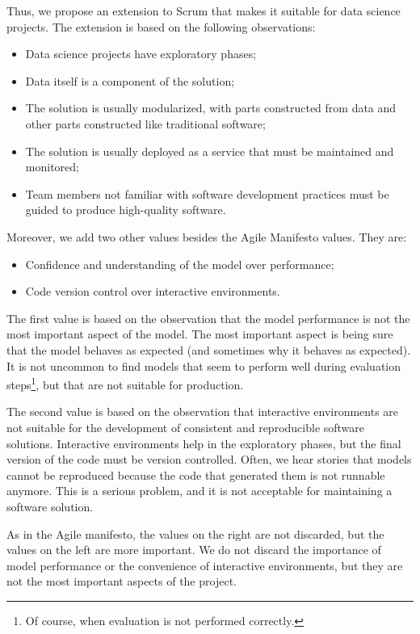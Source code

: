 Thus, we propose an extension to Scrum that makes it suitable for data science projects.
The extension is based on the following observations:
\begin{itemize}
  \itemsep0em
  \item Data science projects have exploratory phases;
  \item Data itself is a component of the solution;
  \item The solution is usually modularized, with parts constructed from data and other parts
    constructed like traditional software;
  \item The solution is usually deployed as a service that must be maintained and
    monitored;
  \item Team members not familiar with software development practices must be guided to
    produce high-quality software.
\end{itemize}

Moreover, we add two other values besides the Agile Manifesto values.  They are:
\begin{itemize}
  \itemsep0em
  \item Confidence and understanding of the model over performance;
  \item Code version control over interactive environments.
\end{itemize}

The first value is based on the observation that the model performance is not the most
important aspect of the model.  The most important aspect is being sure that the model
behaves as expected (and sometimes why it behaves as expected).  It is not uncommon to find
models that seem to perform well during evaluation steps\footnote{Of course, when
evaluation is not performed correctly.}, but that are not suitable for production.

The second value is based on the observation that interactive environments are not suitable
for the development of consistent and reproducible software solutions.  Interactive environments
help in the exploratory phases, but the final version of the code must be version
controlled.  Often, we hear stories that models cannot be reproduced because the code that
generated them is not runnable anymore.  This is a serious problem, and it is not
acceptable for maintaining a software solution.

As in the Agile manifesto, the values on the right are not discarded, but the values on the
left are more important.  We do not discard the importance of model performance or the
convenience of interactive environments, but they are not the most important aspects of the
project.

